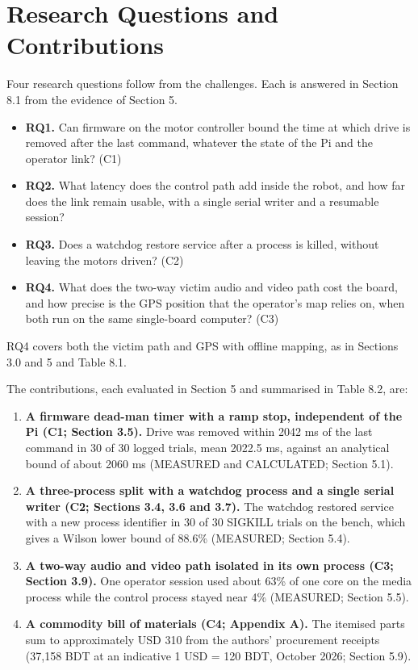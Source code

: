 \section{Research Questions and Contributions}

Four research questions follow from the challenges. Each is answered in Section 8.1 from the evidence of Section 5.

\begin{itemize}
\item \textbf{RQ1.} Can firmware on the motor controller bound the time at which drive is removed after the last command, whatever the state of the Pi and the operator link? (C1)
\item \textbf{RQ2.} What latency does the control path add inside the robot, and how far does the link remain usable, with a single serial writer and a resumable session?
\item \textbf{RQ3.} Does a watchdog restore service after a process is killed, without leaving the motors driven? (C2)
\item \textbf{RQ4.} What does the two-way victim audio and video path cost the board, and how precise is the GPS position that the operator's map relies on, when both run on the same single-board computer? (C3)
\end{itemize}

RQ4 covers both the victim path and GPS with offline mapping, as in Sections 3.0 and 5 and Table 8.1.

The contributions, each evaluated in Section 5 and summarised in Table 8.2, are:

\begin{enumerate}
\item \textbf{A firmware dead-man timer with a ramp stop, independent of the Pi (C1; Section 3.5).} Drive was removed within 2042 ms of the last command in 30 of 30 logged trials, mean 2022.5 ms, against an analytical bound of about 2060 ms (MEASURED and CALCULATED; Section 5.1).
\item \textbf{A three-process split with a watchdog process and a single serial writer (C2; Sections 3.4, 3.6 and 3.7).} The watchdog restored service with a new process identifier in 30 of 30 SIGKILL trials on the bench, which gives a Wilson lower bound of 88.6\% \cite{wilson1927} (MEASURED; Section 5.4).
\item \textbf{A two-way audio and video path isolated in its own process (C3; Section 3.9).} One operator session used about 63\% of one core on the media process while the control process stayed near 4\% (MEASURED; Section 5.5).
\item \textbf{A commodity bill of materials (C4; Appendix A).} The itemised parts sum to approximately USD 310 from the authors' procurement receipts (37,158 BDT at an indicative 1 USD = 120 BDT, October 2026; Section 5.9).
\end{enumerate}

